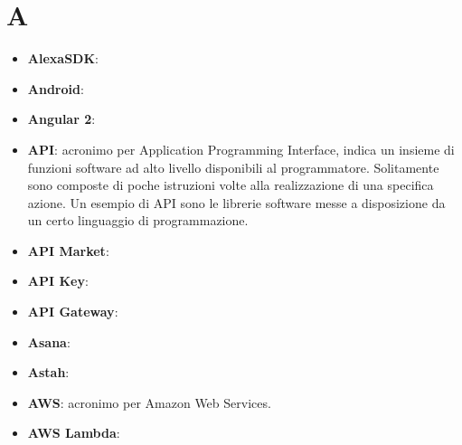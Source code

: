 \section{A}
\begin{itemize}
	\item \textbf{AlexaSDK}:
	\item \textbf{Android}:
	\item \textbf{Angular 2}:
	\item \textbf{API}: acronimo per Application Programming Interface, indica un insieme di funzioni software ad alto livello disponibili al programmatore. Solitamente sono composte di poche istruzioni volte alla realizzazione di una specifica azione. Un esempio di API sono le librerie software messe a disposizione da un certo linguaggio di programmazione.
	\item \textbf{API Market}:
	\item \textbf{API Key}:
	\item \textbf{API Gateway}:
	\item \textbf{Asana}:
	\item \textbf{Astah}:
	\item \textbf{AWS}: acronimo per Amazon Web Services.
	\item \textbf{AWS Lambda}:
\end{itemize}